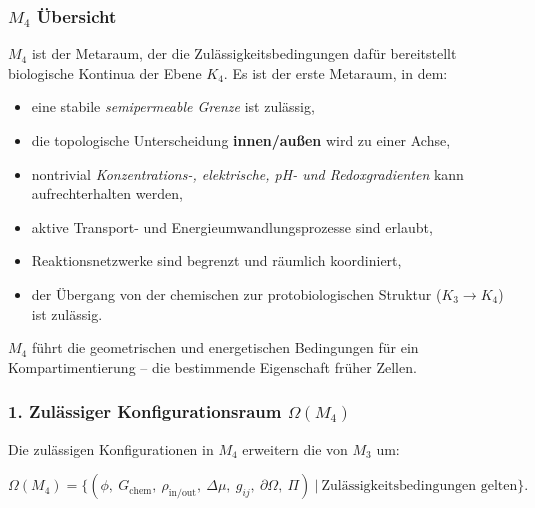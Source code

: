 

\subsubsection{\texorpdfstring{$M_4$}{M_4} Übersicht}
\label{sec:m4-overview}

$M_4$ ist der Metaraum, der die Zulässigkeitsbedingungen dafür bereitstellt
biologische Kontinua der Ebene $K_4$.
Es ist der erste Metaraum, in dem:

\begin{itemize}
    \item eine stabile \emph{semipermeable Grenze} ist zulässig,
    \item die topologische Unterscheidung \textbf{innen/außen} wird zu einer Achse,
    \item nontrivial \emph{Konzentrations-, elektrische, pH- und Redoxgradienten}
    kann aufrechterhalten werden,
    \item aktive Transport- und Energieumwandlungsprozesse sind erlaubt,
    \item Reaktionsnetzwerke sind begrenzt und räumlich koordiniert,
    \item der Übergang von der chemischen zur protobiologischen Struktur ($K_3 \to K_4$)
          ist zulässig.
\end{itemize}

$M_4$ führt die geometrischen und energetischen Bedingungen für ein
Kompartimentierung – die bestimmende Eigenschaft früher Zellen.

\subsubsection*{1. Zulässiger Konfigurationsraum \texorpdfstring{$\Omega(M_4)$}{\Omega(M_4)}}

Die zulässigen Konfigurationen in $M_4$ erweitern die von $M_3$ um:

\[
\Omega(M_4)
=
\Big\{
(\phi,\ G_{\mathrm{chem}},\ \rho_{\mathrm{in/out}},\
\Delta\mu,\ g_{ij},\ \partial\Omega,\ \Pi)
\ \Big|\ \text{Zulässigkeitsbedingungen gelten}
\Big\}.
\]

